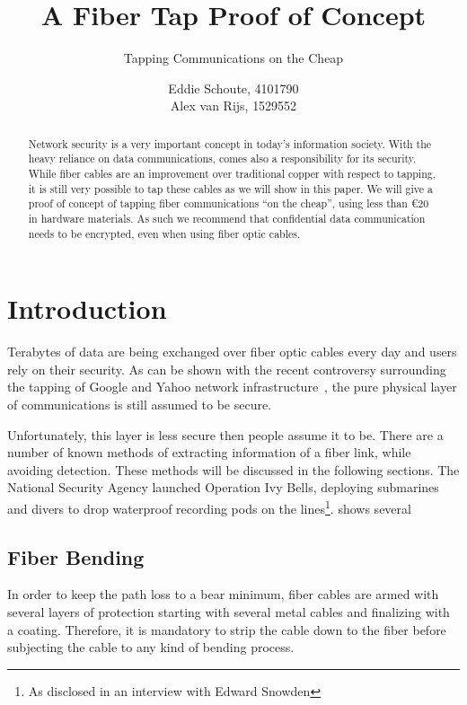 \documentclass[11pt,twoside,a4paper]{scrartcl}
\title{A Fiber Tap Proof of Concept}
\subtitle{Tapping Communications on the Cheap}
\author{%
		Eddie Schoute, 4101790\\
		Alex van Rijs, 1529552
	}
\begin{document}
\maketitle

\begin{abstract}
	\noindent Network security is a very important concept in today's information society.
	With the heavy reliance on data communications, comes also a responsibility for its security.
	While fiber cables are an improvement over traditional copper with respect to tapping,
	it is still very possible to tap these cables as we will show in this paper.
	We will give a proof of concept of tapping fiber communications ``on the cheap'',
	using less than \euro{}$20$ in hardware materials.
	As such we recommend that confidential data communication needs to be encrypted,
	even when using fiber optic cables.
\end{abstract}

\section{Introduction}
	Terabytes of data are being exchanged over fiber optic cables every day and users rely on their security.
	As can be shown with the recent controversy surrounding the tapping of Google and Yahoo network infrastructure~\cite{googleyahootap},
	the pure physical layer of communications is still assumed to be secure.

	Unfortunately, this layer is less secure then people assume it to be. There are a number of known methods of extracting information of a fiber link, while avoiding detection. These methods will be discussed in the following sections. The National Security Agency launched Operation Ivy Bells, deploying submarines and divers to drop waterproof recording pods on the lines\footnote{As disclosed in an interview with Edward Snowden}. \cite{fibertap} shows several 

\subsection{Fiber Bending}
In order to keep the path loss to a bear minimum, fiber cables are armed with several layers of protection starting with several metal cables and finalizing with a coating. Therefore, it is mandatory to strip the cable down to the fiber before subjecting the cable to any kind of bending process. 
\end{document}
